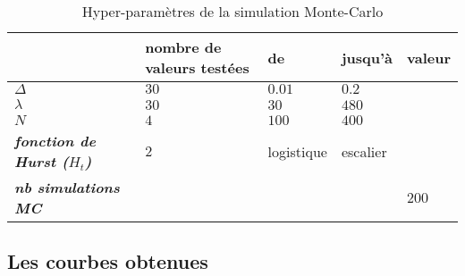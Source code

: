 \begin{table}[H]
	\centering
	\begin{tabular}{l|l|ll|l|}
		\cline{2-5}
		\textbf{}                                                         & \textbf{nombre de valeurs testées} & \multicolumn{1}{l|}{\textbf{de}} & \textbf{jusqu'à}         & \textbf{valeur}          \\ \hline
		\multicolumn{1}{|l|}{\textit{\textbf{$\Delta$}}}                  & $30$                               & $0.01$                           & $0.2$                    & \cellcolor[HTML]{C0C0C0} \\
		\multicolumn{1}{|l|}{\textit{\textbf{$\lambda$}}}                 & $30$                               & $30$                             & $480$                    & \cellcolor[HTML]{C0C0C0} \\
		\multicolumn{1}{|l|}{\textit{\textbf{$N$}}}                       & $4$                                & $100$                            & $400$                    & \cellcolor[HTML]{C0C0C0} \\
		\multicolumn{1}{|l|}{\textit{\textbf{fonction de Hurst ($H_t$)}}} & $2$                                & logistique                       & escalier                 & \cellcolor[HTML]{C0C0C0} \\
		\multicolumn{1}{|l|}{\textit{\textbf{nb simulations MC}}}         & \cellcolor[HTML]{C0C0C0}           & \cellcolor[HTML]{C0C0C0}         & \cellcolor[HTML]{C0C0C0} & $200$                    \\ \hline
	\end{tabular}
	\caption{Hyper-paramètres de la simulation Monte-Carlo}
	\label{tab:hyperparam-mc}
\end{table}

\subsection{Les courbes obtenues}

